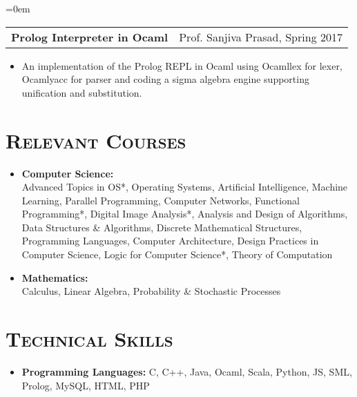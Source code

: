 \documentclass{article}
\makeatletter
\newenvironment{longversion}{}{} %
\newcommand{\headerrow}[2]
{\begin{tabular*}{\linewidth}{l@{\extracolsep{\fill}}r}
	#1 &
	#2 \\
\end{tabular*}}
\newcommand{\tmpsection}[1]{}
\let\tmpsection=\section
\renewcommand{\section}[1]{\tmpsection*{\textsc{#1}}}
\makeatother
\begin{document}
\begin{longversion}
\begin{list} {}{\leftmargin=0em}


\item[]
  \headerrow {\textbf{Prolog Interpreter in Ocaml}} {Prof. Sanjiva Prasad, Spring 2017}
  \begin{itemize} \item[]
  An implementation of the Prolog REPL in Ocaml using Ocamllex for lexer, Ocamlyacc for parser and coding a sigma algebra engine supporting unification and substitution.
  \end{itemize}
  
\end{list}
\end{longversion}

\begin{longversion}
\section{Relevant Courses}
\begin{itemize}
  \setlength\itemsep{-1em}
    \item \textbf{Computer Science:} \\
      Advanced Topics in OS*, Operating Systems, Artificial Intelligence, Machine Learning, Parallel Programming, Computer Networks, Functional Programming*, Digital Image Analysis*, Analysis and Design of Algorithms, Data Structures \& Algorithms, Discrete Mathematical Structures, Programming Languages, Computer Architecture, Design Practices in Computer Science, Logic for Computer Science*, Theory of Computation  \\

    \item \textbf{Mathematics:} \\
      Calculus, Linear Algebra, Probability \& Stochastic Processes
\end{itemize}
\end{longversion}

\begin{longversion}
\section{Technical Skills}
\begin{itemize}
    \item \textbf{Programming Languages:} C,  C++, Java, Ocaml, Scala, Python, JS, SML, Prolog, MySQL, HTML, PHP
\end{itemize}
\end{longversion}
\end{document}
